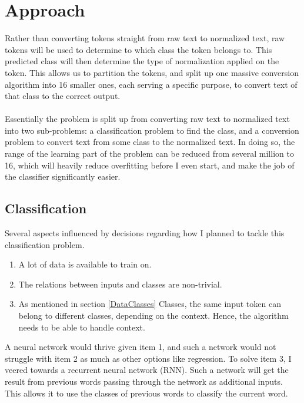 \documentclass[a4paper, 9pt]{extarticle}
\begin{document}
\section{Approach}
Rather than converting tokens straight from raw text to normalized text, raw tokens will be used to determine to which class the token belongs to. This predicted class will then determine the type of normalization applied on the token. This allows us to partition the tokens, and split up one massive conversion algorithm into 16 smaller ones, each serving a specific purpose, to convert text of that class to the correct output.\\
\\
Essentially the problem is split up from converting raw text to normalized text into two sub-problems: a classification problem to find the class, and a conversion problem to convert text from some class to the normalized text. In doing so, the range of the learning part of the problem can be reduced from several million to 16, which will heavily reduce overfitting before I even start, and make the job of the classifier significantly easier.

\subsection{Classification}

Several aspects influenced by decisions regarding how I planned to tackle this classification problem.
\begin{enumerate}
    \itemsep-0.2em
    \item A lot of data is available to train on. 
    \item The relations between inputs and classes are non-trivial. 
    \item As mentioned in section \ref{DataClasses} Classes, the same input token can belong to different classes, depending on the context. Hence, the algorithm needs to be able to handle context. 
\end{enumerate}
A neural network would thrive given item 1, and such a network would not struggle with item 2 as much as other options like regression. To solve item 3, I veered towards a recurrent neural network (RNN). Such a network will get the result from previous words passing through the network as additional inputs. This allows it to use the classes of previous words to classify the current word.\\
\end{document}
